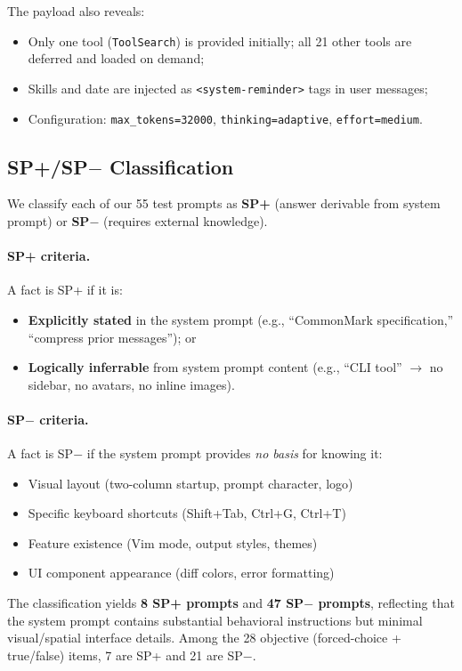\documentclass[10pt,twocolumn]{article}
\begin{document}
The payload also reveals:
\begin{itemize}
  \item Only one tool (\texttt{ToolSearch}) is provided initially; all 21 other tools are deferred and loaded on demand;
  \item Skills and date are injected as \texttt{<system-reminder>} tags in user messages;
  \item Configuration: \texttt{max\_tokens=32000}, \texttt{thinking=adaptive}, \texttt{effort=medium}.
\end{itemize}

\subsection{SP+/SP$-$ Classification}

We classify each of our 55 test prompts as \textbf{SP+} (answer derivable from system prompt) or \textbf{SP$-$} (requires external knowledge).

\paragraph{SP+ criteria.} A fact is SP+ if it is:
\begin{itemize}
  \item \textbf{Explicitly stated} in the system prompt (e.g., ``CommonMark specification,'' ``compress prior messages''); or
  \item \textbf{Logically inferrable} from system prompt content (e.g., ``CLI tool'' $\rightarrow$ no sidebar, no avatars, no inline images).
\end{itemize}

\paragraph{SP$-$ criteria.} A fact is SP$-$ if the system prompt provides \textit{no basis} for knowing it:
\begin{itemize}
  \item Visual layout (two-column startup, prompt character, logo)
  \item Specific keyboard shortcuts (Shift+Tab, Ctrl+G, Ctrl+T)
  \item Feature existence (Vim mode, output styles, themes)
  \item UI component appearance (diff colors, error formatting)
\end{itemize}

The classification yields \textbf{8 SP+ prompts} and \textbf{47 SP$-$ prompts}, reflecting that the system prompt contains substantial behavioral instructions but minimal visual/spatial interface details.
Among the 28 objective (forced-choice + true/false) items, 7 are SP+ and 21 are SP$-$.
\end{document}
